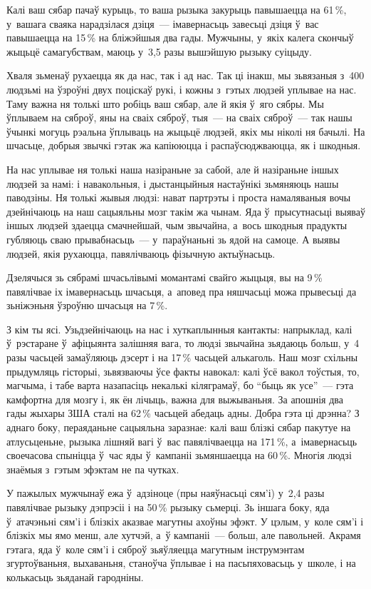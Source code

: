 Калі ваш сябар пачаў курыць, то ваша рызыка закурыць павышаецца на 61\,\%, у~вашага сваяка нарадзілася дзіця~--- імавернасьць завесьці дзіця ў~вас павышаецца на 15\,\% на бліжэйшыя два гады. Мужчыны, у~якіх калега скончыў жыцьцё самагубствам, маюць у~3,5 разы вышэйшую рызыку суіцыду.

Хваля зьменаў рухаецца як да нас, так і ад нас. Так ці інакш, мы зьвязаныя з~400 людзьмі на ўзроўні двух поціскаў рукі, і кожны з~гэтых людзей уплывае на нас. Таму важна ня толькі што робіць ваш сябар, але й якія ў~яго сябры. Мы ўплываем на сяброў, яны на сваіх сяброў, тыя~--- на сваіх сяброў~--- так нашы ўчынкі могуць рэальна ўплываць на жыцьцё людзей, якіх мы ніколі ня бачылі. На шчасьце, добрыя звычкі гэтак жа капіююцца і распаўсюджваюцца, як і шкодныя.

На нас уплывае ня толькі наша назіраньне за сабой, але й назіраньне іншых людзей за намі: і навакольныя, і дыстанцыйныя настаўнікі зьмяняюць нашы паводзіны. Ня толькі жывыя людзі: нават партрэты і проста намаляваныя вочы дзейнічаюць на наш сацыяльны мозг такім жа чынам. Яда ў~прысутнасьці выяваў іншых людзей здаецца смачнейшай, чым звычайна, а~вось шкодныя прадукты губляюць сваю прывабнасьць~--- у~параўнаньні зь ядой на самоце. А выявы людзей, якія рухаюцца, павялічваюць фізычную актыўнасьць.

Дзелячыся зь сябрамі шчасьлівымі момантамі свайго жыцьця, вы на 9\,\% павялічвае іх імавернасьць шчасьця, а~аповед пра няшчасьці можа прывесьці да зьніжэньня ўзроўню шчасьця на 7\,\%.

З кім ты ясі. Узьдзейнічаюць на нас і хуткаплынныя кантакты: напрыклад, калі ў~рэстаране ў~афіцыянта залішняя вага, то людзі звычайна зьядаюць больш, у~4 разы часьцей замаўляюць дэсерт і на 17\,\% часьцей алькаголь. Наш мозг схільны прыдумляць гісторыі, зьвязваючы ўсе факты навокал: калі ўсё вакол тоўстыя, то, магчыма, і табе варта назапасіць некалькі кіляграмаў, бо ``быць як усе''~--- гэта камфортна для мозгу і, як ён лічыць, важна для выжываньня. За апошнія два гады жыхары ЗША сталі на 62\,\% часьцей абедаць адны. Добра гэта ці дрэнна? З аднаго боку, пераяданьне сацыяльна заразнае: калі ваш блізкі сябар пакутуе на атлусьценьне, рызыка лішняй вагі ў~вас павялічваецца на 171\,\%, а~імавернасьць своечасова спыніцца ў~час яды ў~кампаніі зьмяншаецца на 60\,\%. Многія людзі знаёмыя з~гэтым эфэктам не па чутках.

У пажылых мужчынаў ежа ў~адзіноце (пры наяўнасьці сям'і) у~2,4 разы павялічвае рызыку дэпрэсіі і на 50\,\% рызыку сьмерці. Зь іншага боку, яда ў~атачэньні сям'і і блізкіх аказвае магутны ахоўны эфэкт. У цэлым, у~коле сям'і і блізкіх мы ямо менш, але хутчэй, а~ў кампаніі~--- больш, але павольней. Акрамя гэтага, яда ў~коле сям'і і сяброў зьяўляецца магутным інструмэнтам згуртоўваньня, выхаваньня, станоўча ўплывае і на пасьпяховасьць у~школе, і на колькасьць зьяданай гародніны.

